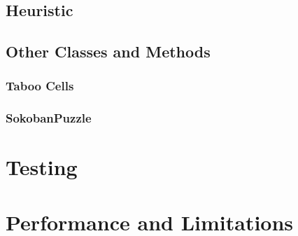 \documentclass[a4paper,12pt]{article}
\begin{document}
\subsection{Heuristic}

\subsection{Other Classes and Methods}
\subsubsection{Taboo Cells}
\subsubsection{SokobanPuzzle}

\section{Testing}

\section{Performance and Limitations}
\end{document}
